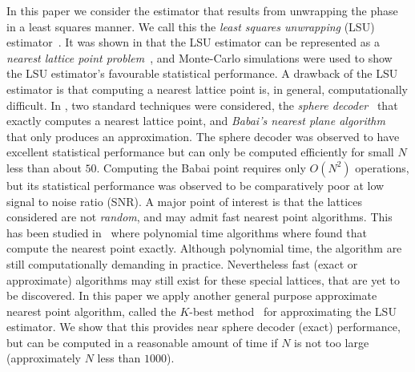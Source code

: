\documentclass[journal]{IEEEtran}
\begin{document}
In this paper we consider the estimator that results from unwrapping the phase in a least squares manner.  We call this the \emph{least squares unwrapping} (LSU) estimator~\cite{McKilliam2009asilomar_polyest_lattice, McKilliamFrequencyEstimationByPhaseUnwrapping2009,McKilliam2010thesis}.  It was shown in \cite{McKilliam2009asilomar_polyest_lattice, McKilliamFrequencyEstimationByPhaseUnwrapping2009} that the LSU estimator can be represented as a \emph{nearest lattice point problem}~\cite{Agrell2002}, and Monte-Carlo simulations were used to show the LSU estimator's favourable statistical performance. %
A drawback of the LSU estimator is that computing a nearest lattice point is, in general, computationally difficult.  In \cite{McKilliam2009asilomar_polyest_lattice}, two standard techniques were considered, the \emph{sphere decoder}~\cite{Pohst_sphere_decoder_1981,Viterbo_sphere_decoder_1999} that exactly computes a nearest lattice point, and \emph{Babai's nearest plane algorithm}~\cite{Babai1986} that only produces an approximation. The sphere decoder was observed to have excellent statistical performance but can only be computed efficiently for small $N$ less than about $50$.  Computing the Babai point requires only $O(N^2)$ operations, but its statistical performance was observed to be comparatively poor at low signal to noise ratio (SNR). A major point of interest is that the lattices considered are not \emph{random}, and may admit fast nearest point algorithms.  This has been studied in~\cite{McKilliam2010thesis} where polynomial time algorithms where found that compute the nearest point exactly.  Although polynomial time, the algorithm are still computationally demanding in practice.  Nevertheless fast (exact or approximate) algorithms may still exist for these special lattices, that are yet to be discovered.  In this paper we apply another general purpose approximate nearest point algorithm, called the $K$-best method~\cite{Zhan2006_K_best_sphere_decoder} for approximating the LSU estimator.  We show that this provides near sphere decoder (exact) performance, but can be computed in a reasonable amount of time if $N$ is not too large (approximately $N$ less than $1000$).  %
\end{document}
